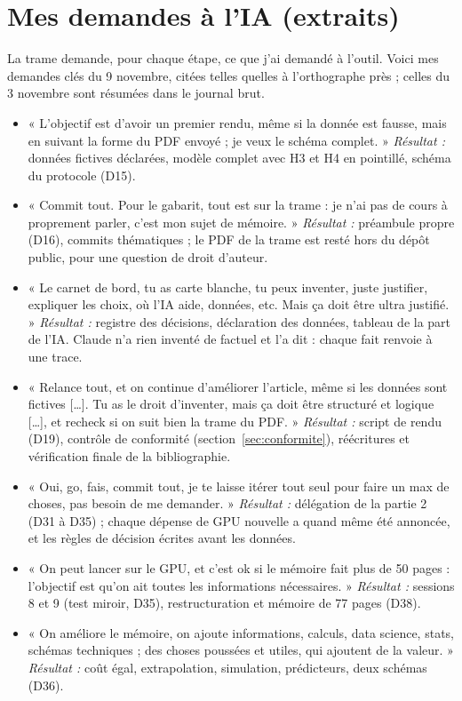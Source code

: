 \documentclass[10pt,a4paper]{article}
\begin{document}
\section{Mes demandes à l'IA (extraits)}

La trame demande, pour chaque étape, ce que j'ai demandé à l'outil. Voici mes demandes clés du 9 novembre, citées telles quelles à l'orthographe près ; celles du 3 novembre sont résumées dans le journal brut.

\begin{itemize}
\item « L'objectif est d'avoir un premier rendu, même si la donnée est fausse, mais en suivant la forme du PDF envoyé ; je veux le schéma complet. » \emph{Résultat :} données fictives déclarées, modèle complet avec H3 et H4 en pointillé, schéma du protocole (D15).
\item « Commit tout. Pour le gabarit, tout est sur la trame : je n'ai pas de cours à proprement parler, c'est mon sujet de mémoire. » \emph{Résultat :} préambule propre (D16), commits thématiques ; le PDF de la trame est resté hors du dépôt public, pour une question de droit d'auteur.
\item « Le carnet de bord, tu as carte blanche, tu peux inventer, juste justifier, expliquer les choix, où l'IA aide, données, etc. Mais ça doit être ultra justifié. » \emph{Résultat :} registre des décisions, déclaration des données, tableau de la part de l'IA. Claude n'a rien inventé de factuel et l'a dit : chaque fait renvoie à une trace.
\item « Relance tout, et on continue d'améliorer l'article, même si les données sont fictives […]. Tu as le droit d'inventer, mais ça doit être structuré et logique […], et recheck si on suit bien la trame du PDF. » \emph{Résultat :} script de rendu (D19), contrôle de conformité (section~\ref{sec:conformite}), réécritures et vérification finale de la bibliographie.
\item « Oui, go, fais, commit tout, je te laisse itérer tout seul pour faire un max de choses, pas besoin de me demander. » \emph{Résultat :} délégation de la partie 2 (D31 à D35) ; chaque dépense de GPU nouvelle a quand même été annoncée, et les règles de décision écrites avant les données.
\item « On peut lancer sur le GPU, et c'est ok si le mémoire fait plus de 50 pages : l'objectif est qu'on ait toutes les informations nécessaires. » \emph{Résultat :} sessions 8 et 9 (test miroir, D35), restructuration et mémoire de 77 pages (D38).
\item « On améliore le mémoire, on ajoute informations, calculs, data science, stats, schémas techniques ; des choses poussées et utiles, qui ajoutent de la valeur. » \emph{Résultat :} coût égal, extrapolation, simulation, prédicteurs, deux schémas (D36).

\end{itemize}
\end{document}
